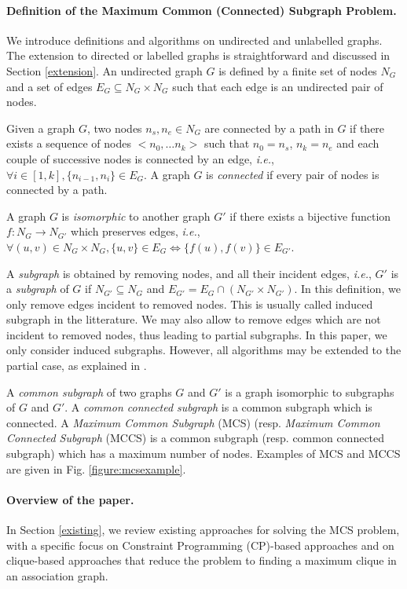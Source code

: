 \documentclass{llncs}
\begin{document}
\paragraph{Definition of the Maximum Common (Connected) Subgraph Problem.}
We introduce definitions and algorithms on undirected and unlabelled graphs. The extension to
directed or labelled graphs is straightforward and discussed in Section \ref{extension}. An
undirected graph $G$ is defined by a finite set of nodes $N_G$ and a set of edges $E_G\subseteq
N_G\times N_G$ such that each edge is an undirected pair of nodes.

Given a graph $G$, two nodes $n_s, n_e \in N_G$ are connected by a path in $G$ if there exists a
sequence of nodes $<n_0,\ldots n_k>$ such that $n_0=n_s$, $n_k=n_e$ and each couple of successive
nodes is connected by an edge, {\em i.e.}, $\forall i\in [1,k], \{n_{i-1},n_i\}\in E_G$. A graph $G$
is \emph{connected} if every pair of nodes is connected by a path.

A graph $G$ is \emph{isomorphic} to another graph $G'$ if there exists a bijective function
$f:N_G\rightarrow N_{G'}$ which preserves edges, \emph{i.e.}, $\forall (u,v)\in N_G\times N_G,
\{u,v\}\in E_G\Leftrightarrow \{f(u),f(v)\}\in E_{G'}$.

A {\em subgraph} is obtained by removing nodes, and all their incident edges, {\em i.e.}, $G'$ is a
\emph{subgraph} of $G$ if $N_{G'}\subseteq N_G$ and $E_{G'}=E_G\cap(N_{G'}\times N_{G'})$.
In this definition, we only remove edges incident to removed nodes. This is usually called induced
subgraph in the litterature. We may also allow to remove edges which are not incident to removed
nodes, thus leading to partial subgraphs. In this paper, we only consider induced subgraphs.
However, all algorithms may be extended to the partial case, as explained in
\cite{DBLP:conf/cp/NdiayeS11}.

A \emph{common subgraph} of two graphs $G$ and $G'$ is a graph isomorphic to subgraphs of $G$ and
$G'$. A \emph{common connected subgraph} is a common subgraph which is connected.
A \emph{Maximum Common Subgraph} (MCS) (resp. \emph{Maximum Common Connected Subgraph} (MCCS) is a
common subgraph (resp. common connected subgraph) which has a maximum number of nodes. Examples of
MCS and MCCS are given in Fig. \ref{figure:mcsexample}.

\paragraph{Overview of the paper.} In Section \ref{existing}, we review existing approaches for
solving the MCS problem, with a specific focus on Constraint Programming (CP)-based approaches and
on clique-based approaches that reduce the problem to finding a maximum clique in an association
graph.
\end{document}
